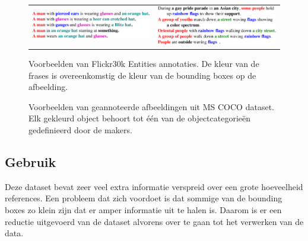 \begin{figure}[!tb]
\begin{tabular}[t]{cc}
      \includegraphics[valign = T,width=.4\columnwidth]{Images/example_hat_text.pdf}&
      \includegraphics[valign = T,width=.4\columnwidth]{Images/example_parade_text.pdf}
  \end{tabular}
\caption{Voorbeelden van Flickr30k Entities annotaties. De kleur van de frases is overeenkomstig de kleur van de bounding boxes op de afbeelding.}
\label{fig:entities}
\end{figure}

\begin{figure}
    \centering
    \hfill
    \caption{Voorbeelden van geannoteerde afbeeldingen uit MS COCO dataset. Elk gekleurd object behoort tot \'e\'en van de objectcategorie\"en gedefinieerd door de makers.}
    \label{fig:cocoexamples}
\end{figure}



\subsection{Gebruik}
\label{sub:Gebruik}
Deze dataset bevat zeer veel extra informatie verspreid over een grote hoeveelheid references. Een probleem dat zich voordoet is dat sommige van de bounding boxes zo klein zijn dat er amper informatie uit te halen is. Daarom is er een reductie uitgevoerd van de dataset alvorens over te gaan tot het verwerken van de data. 

